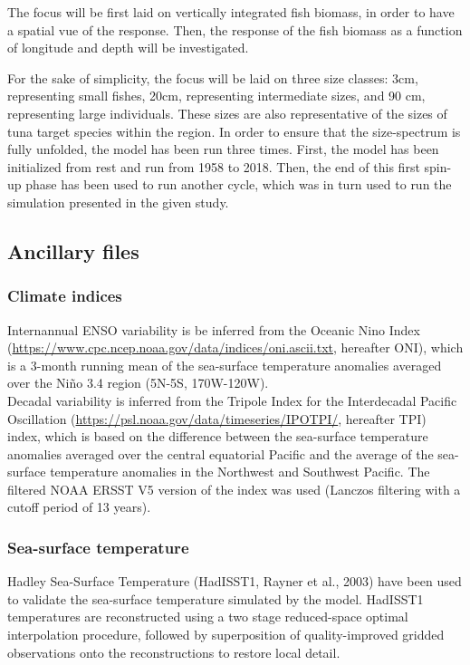 The focus will be first laid on vertically integrated fish biomass, in order to have a spatial vue of the response. Then, the response of the fish biomass as a function of longitude and depth will be investigated.

For the sake of simplicity, the focus will be laid on three size classes: 3cm, representing small fishes, 20cm, representing intermediate sizes, and 90 cm, representing large individuals. These sizes are also representative of the sizes of tuna target species within the region.
In order to ensure that the size-spectrum is fully unfolded, the model has been run three times. First, the model has been initialized from rest and run from 1958 to 2018. Then, the end of this first spin-up phase has been used to run another cycle, which was in turn used to run the simulation presented in the given study.\\


\subsection{Ancillary files}

\subsubsection{Climate indices}
Internannual ENSO variability is be inferred from the Oceanic Nino Index (\url{https://www.cpc.ncep.noaa.gov/data/indices/oni.ascii.txt}, hereafter ONI), which is a 3-month running mean of the sea-surface temperature anomalies averaged over the Niño 3.4 region (5N-5S, 170W-120W).\\ 

Decadal variability is inferred from the Tripole Index for the Interdecadal Pacific Oscillation (\url{https://psl.noaa.gov/data/timeseries/IPOTPI/}, hereafter TPI) index, which is based on the difference between the sea-surface temperature anomalies averaged over the central equatorial Pacific and the average of the sea-surface temperature anomalies in the Northwest and Southwest Pacific. The filtered NOAA ERSST V5 version of the index was used (Lanczos filtering with a cutoff period of  13 years).\\ 

\subsubsection{Sea-surface temperature} 

Hadley Sea-Surface Temperature (HadISST1, Rayner et al., 2003) have been used to validate the sea-surface temperature simulated by the model. HadISST1 temperatures are reconstructed using a two stage reduced-space optimal interpolation procedure, followed by superposition of quality-improved gridded observations onto the reconstructions to restore local detail. 


